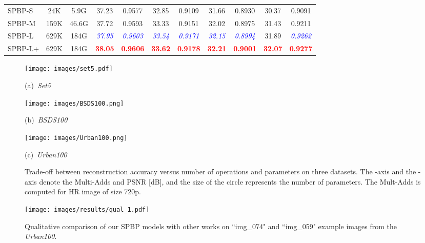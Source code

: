 \documentclass[a4paper,11pt]{article}
\begin{document}
\begin{table}[!ht]
\begin{adjustbox}{width=\columnwidth,center}
\begin{tabular}{l c c c|c||c|c||c|c||c|c}
			
\midrule
			SPBP-S & 24K & 5.9G &  37.23  & 0.9577  &  32.85 &  0.9109 & 31.66 &  0.8930 & 30.37 &  0.9091 \\
			SPBP-M & 159K & 46.6G & 37.72  & 0.9593 &  33.33 &  0.9151 & 32.02 &  0.8975 & 31.43 &  0.9211 \\
			SPBP-L & 629K & 184G &  \textit{\textcolor{blue}{37.95}}  & \textit{\textcolor{blue}{0.9603}} &  \textit{\textcolor{blue}{33.54}} &  \textit{\textcolor{blue}{0.9171}} &\textit{\textcolor{blue}{32.15}} &  \textit{\textcolor{blue}{0.8994}} & 31.89 &  \textit{\textcolor{blue}{0.9262}} \\	
			SPBP-L+ & 629K & 184G &  \textbf{\textcolor{red}{38.05}}  & \textbf{\textcolor{red}{0.9606}} &  \textbf{\textcolor{red}{33.62}} &  \textbf{\textcolor{red}{0.9178}} &  \textbf{\textcolor{red}{32.21}} &  \textbf{\textcolor{red}{0.9001}} & \textbf{\textcolor{red}{32.07}} &  \textbf{\textcolor{red}{0.9277}}\\

\bottomrule
\end{tabular}
\end{adjustbox}   
\label{tab:quantresults}
\end{table}

\begin{figure*}[!ht]
\centering
\begin{minipage}[h]{.32\linewidth}
	\centerline{\texttt{[image: images/set5.pdf]}}
	\centerline{(a)~\textit{Set5}~\cite{Yang_image}}
\end{minipage}
\begin{minipage}[h]{.32\linewidth}
	\centerline{\texttt{[image: images/BSDS100.png]}}
	\centerline{(b)~\textit{BSDS100}~\cite{arbelaez2010contour}}
\end{minipage}
\begin{minipage}[h]{.32\linewidth}
	\centerline{\texttt{[image: images/Urban100.png]}}
	\centerline{(c)~\textit{Urban100}~\cite{Urban}}
\end{minipage}
        \caption{Trade-off between reconstruction accuracy versus number of operations and parameters on three datasets. The -axis and the -axis denote the Multi-Adds and PSNR [dB],  and the size of the circle represents the number of parameters. The Mult-Adds is computed for HR image of size 720p.}
\label{performance}
\end{figure*}

\begin{figure}[!ht]
        \centering
        \texttt{[image: images/results/qual\_1.pdf]}
\caption{Qualitative comparison of our SPBP models with other works on ``img\_074" and ``img\_059" example images from the \textit{Urban100}.} 
\label{performance_visual_1}   
\end{figure}
\end{document}

